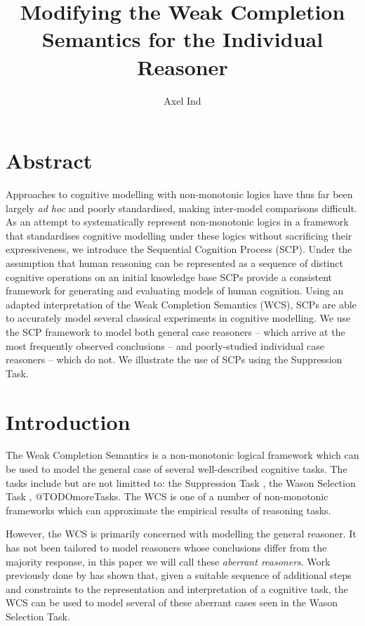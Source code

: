 \documentclass{article}
\begin{document}
\title{Modifying the Weak Completion Semantics for the Individual Reasoner}
\author{Axel Ind}

\maketitle

\section*{Abstract}
Approaches to cognitive modelling with non-monotonic logics have thus far been largely \textit{ad hoc} and poorly standardised, making inter-model comparisons difficult. As an attempt to systematically represent non-monotonic logics in a framework that standardises cognitive modelling under these logics without sacrificing their expressiveness, we introduce the Sequential Cognition Process (SCP). Under the assumption that human reasoning can be represented as a sequence of distinct cognitive operations on an initial knowledge base SCPs provide a consistent framework for generating and evaluating models of human cognition. Using an adapted interpretation of the Weak Completion Semantics (WCS), SCPs are able to accurately model several classical experiments in cognitive modelling. We use the SCP framework to model both general case reasoners -- which arrive at the most frequently observed conclusions -- and poorly-studied individual case reasoners -- which do not. We illustrate the use of SCPs using the Suppression Task.

\section{Introduction}
The Weak Completion Semantics \citep{holldobler2015weak} is a non-monotonic logical framework which can be used to model the general case of several well-described cognitive tasks. The tasks include but are not limitted to: the Suppression Task \citep{byrne1989suppressing}, the Wason Selection Task \citep{wason1968reasoning}, @TODOmoreTasks. The WCS is one of a number of non-monotonic frameworks \citep{ragni2017formal} which can approximate the empirical results of reasoning tasks.

However, the WCS is primarily concerned with modelling the general reasoner. It has not been tailored to model reasoners whose conclusions differ from the majority response, in this paper we will call these \textit{aberrant reasoners}. Work previously done by \cite{breu2019weak} has shown that, given a suitable sequence of additional steps and constraints to the representation and interpretation of a cognitive task, the WCS can be used to model several of these aberrant cases seen in the Wason Selection Task.
\end{document}
